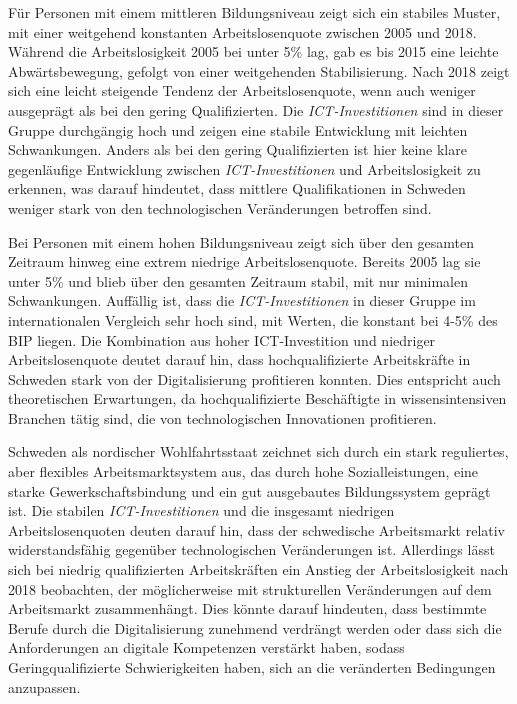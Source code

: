Für Personen mit einem mittleren Bildungsniveau zeigt sich ein stabiles Muster, mit 
einer weitgehend konstanten Arbeitslosenquote zwischen 2005 und 2018. Während die 
Arbeitslosigkeit 2005 bei unter 5\% lag, gab es bis 2015 eine leichte Abwärtsbewegung, 
gefolgt von einer weitgehenden Stabilisierung. Nach 2018 zeigt sich eine leicht steigende 
Tendenz der Arbeitslosenquote, wenn auch weniger ausgeprägt als bei den gering 
Qualifizierten. Die \textit{\ac{ICT}-Investitionen} sind in dieser Gruppe durchgängig 
hoch und zeigen eine stabile Entwicklung mit leichten Schwankungen. Anders als bei den 
gering Qualifizierten ist hier keine klare gegenläufige Entwicklung zwischen 
\textit{\ac{ICT}-Investitionen} und Arbeitslosigkeit zu erkennen, was darauf hindeutet, 
dass mittlere Qualifikationen in Schweden weniger stark von den technologischen 
Veränderungen betroffen sind.

Bei Personen mit einem hohen Bildungsniveau zeigt sich über den gesamten Zeitraum 
hinweg eine extrem niedrige Arbeitslosenquote. Bereits 2005 lag sie unter 5\% und blieb 
über den gesamten Zeitraum stabil, mit nur minimalen Schwankungen. Auffällig ist, dass 
die \textit{\ac{ICT}-Investitionen} in dieser Gruppe im internationalen Vergleich sehr 
hoch sind, mit Werten, die konstant bei 4-5\% des \ac{BIP} liegen. Die Kombination aus 
hoher \ac{ICT}-Investition und niedriger Arbeitslosenquote deutet darauf hin, dass 
hochqualifizierte Arbeitskräfte in Schweden stark von der Digitalisierung profitieren 
konnten. Dies entspricht auch theoretischen Erwartungen, da hochqualifizierte 
Beschäftigte in wissensintensiven Branchen tätig sind, die von technologischen 
Innovationen profitieren.

Schweden als nordischer Wohlfahrtsstaat zeichnet sich durch ein stark reguliertes, 
aber flexibles Arbeitsmarktsystem aus, das durch hohe Sozialleistungen, eine starke 
Gewerkschaftsbindung und ein gut ausgebautes Bildungssystem geprägt ist. Die stabilen 
\textit{\ac{ICT}-Investitionen} und die insgesamt niedrigen Arbeitslosenquoten deuten 
darauf hin, dass der schwedische Arbeitsmarkt relativ widerstandsfähig gegenüber 
technologischen Veränderungen ist. Allerdings lässt sich bei niedrig qualifizierten 
Arbeitskräften ein Anstieg der Arbeitslosigkeit nach 2018 beobachten, der 
möglicherweise mit strukturellen Veränderungen auf dem Arbeitsmarkt zusammenhängt. 
Dies könnte darauf hindeuten, dass bestimmte Berufe durch die Digitalisierung 
zunehmend verdrängt werden oder dass sich die Anforderungen an digitale Kompetenzen 
verstärkt haben, sodass Geringqualifizierte Schwierigkeiten haben, sich an die 
veränderten Bedingungen anzupassen.

